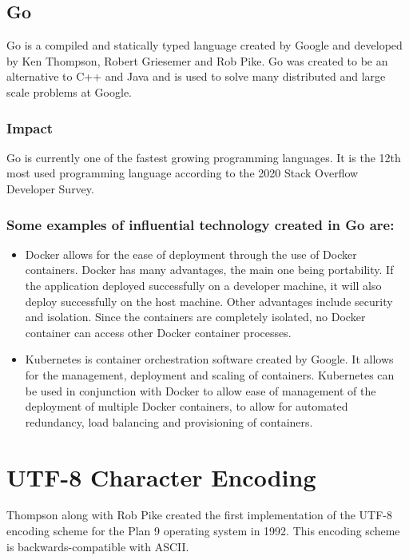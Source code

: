 \documentclass{article}
\begin{document}
\subsection{Go}
Go is a compiled and statically typed language created by Google and developed
by Ken Thompson, Robert Griesemer and Rob Pike. Go was created to be an
alternative to C++ and Java and is used to solve many distributed and large
scale problems at Google.

\subsubsection{Impact}
Go is currently one of the fastest growing programming languages. It is the
12th most used programming language according to the 2020 Stack Overflow
Developer Survey.\cite{dev2020survey}

\subsubsection*{Some examples of influential technology created in Go are:}
\begin{itemize}
  \item Docker allows for the ease of deployment through the use of Docker
    containers. Docker has many advantages, the main one being portability. If
    the application deployed successfully on a developer machine, it will also
    deploy successfully on the host machine. Other advantages include security
    and isolation. Since the containers are completely isolated, no Docker
    container can access other Docker container processes.
  \item Kubernetes is container orchestration software created by Google. It
    allows for the management, deployment and scaling of containers. Kubernetes
    can be used in conjunction with Docker to allow ease of management of the
    deployment of multiple Docker containers, to allow for automated
    redundancy, load balancing and provisioning of containers.
\end{itemize}

\section{UTF-8 Character Encoding}
Thompson along with Rob Pike created the first implementation of the UTF-8
encoding scheme for the Plan 9 operating system in 1992.\cite{pikehello} This
encoding scheme is backwards-compatible with ASCII.
\end{document}
